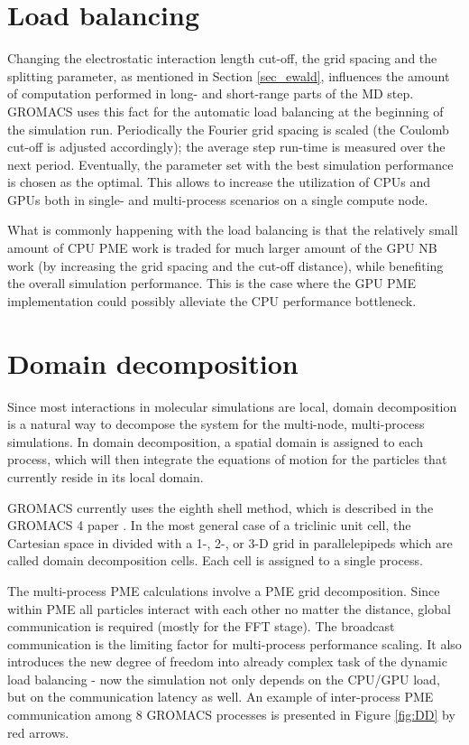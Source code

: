 \documentclass[12pt,a4paper,notitlepage]{report}
\newcommand{\draft}[1]{#1}
\begin{document}
\section{Load balancing} \label{PMEtuning}
Changing the electrostatic interaction length cut-off, the grid spacing and the splitting parameter, as mentioned in Section \ref{sec_ewald}, influences the amount of computation performed in long- and short-range parts of the MD step. GROMACS uses this fact for the automatic load balancing at the beginning of the simulation run. Periodically the Fourier grid spacing is scaled (the Coulomb cut-off is adjusted accordingly); the average step run-time is measured over the next period. Eventually, the parameter set with the best simulation performance is chosen as the optimal. This allows to increase the utilization of CPUs and GPUs both in single- and multi-process scenarios on a single compute node. 

What is commonly happening with the load balancing is that the relatively small amount of CPU PME work is traded for much larger amount of the GPU NB work (by increasing the grid spacing and the cut-off distance), while benefiting the overall simulation performance.
This is the case where the GPU PME implementation could possibly alleviate the CPU performance bottleneck. 

\section{Domain decomposition} \label{chapter:DD}
Since most interactions in molecular simulations are local, domain decomposition is a natural way to decompose the system for the multi-node, multi-process simulations. In domain decomposition, a spatial domain is assigned to each process,
which will then integrate the equations of motion for the particles that currently reside in its local
domain.

GROMACS currently uses the eighth shell method, which is described in the GROMACS 4 paper \cite{gromacs4dd}. In the most general case of a triclinic unit cell, the Cartesian space in divided with a 1-, 2-, or 3-D grid in
parallelepipeds which are called domain decomposition cells. Each cell is assigned to a single 
process. 

The multi-process PME calculations involve a PME grid decomposition.
Since within PME all particles interact with each other no matter the distance, global communication is required (mostly for the FFT stage). The broadcast communication is the limiting factor for multi-process performance scaling. It also introduces the new degree of freedom into already complex task of the dynamic load balancing - now the simulation not only depends on the CPU/GPU load, but on the communication latency as well. An example of inter-process PME communication among 8 GROMACS processes is presented in Figure \ref{fig:DD} by red arrows.
\end{document}
